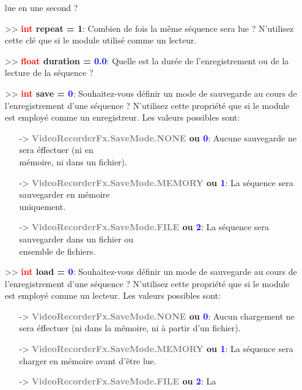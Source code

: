 \documentclass[a4paper, 11pt]{article}
\begin{document}
\begin{itemize}
		lue en une second ?\\
	 	\item[>> \textbf{\textcolor{red}{int} repeat = 1}:] Combien de fois la même séquence sera lue ?
	 	N'utilisez cette clé que si le module utilisé comme un lecteur.\\
		\item[>> \textbf{\textcolor{red}{float} duration = \textcolor{blue}{0.0}}:] Quelle est la durée
		de l'enregistrement ou de la lecture de la séquence ?\\
		\newpage \item[>> \textbf{\textcolor{red}{int} save = \textcolor{blue}{0}}:] Souhaitez-vous définir
		un mode de sauvegarde au cours de l'enregistrement d'une séquence ? N'utilisez cette propriété que
		si le module est employé comme un enregistreur. Les valeurs possibles sont:
		\begin{itemize}
			\item[-> \textbf{\textcolor{gray}{VideoRecorderFx.SaveMode.NONE} ou \textcolor{blue}{0}}:]
			Aucune sauvegarde ne sera éffectuer (ni en \\mémoire, ni dans un fichier).
			\item[-> \textbf{\textcolor{gray}{VideoRecorderFx.SaveMode.MEMORY} ou \textcolor{blue}{1}}:] La 
			séquence sera sauvegarder en mémoire \\uniquement.
			\item[-> \textbf{\textcolor{gray}{VideoRecorderFx.SaveMode.FILE} ou \textcolor{blue}{2}}:] La 
			séquence sera sauvegarder dans un fichier ou \\ensemble de fichiers.\\
		\end{itemize}
		\item[>> \textbf{\textcolor{red}{int} load = \textcolor{blue}{0}}:] Souhaitez-vous définir un mode
		de sauvegarde au cours de l'enregistrement d'une séquence ? N'utilisez cette propriété que si le
		module est employé comme un lecteur. Les valeurs possibles sont:
		\begin{itemize}
			\item[-> \textbf{\textcolor{gray}{VideoRecorderFx.SaveMode.NONE} ou \textcolor{blue}{0}}:]
			Aucun chargement ne sera éffectuer (ni dans la mémoire, ni à partir d'un fichier).
			\item[-> \textbf{\textcolor{gray}{VideoRecorderFx.SaveMode.MEMORY} ou \textcolor{blue}{1}}:] La 
			séquence sera charger en mémoire avant d'être lue.
			\item[-> \textbf{\textcolor{gray}{VideoRecorderFx.SaveMode.FILE} ou \textcolor{blue}{2}}:] La 

\end{itemize}
\end{itemize}
\end{document}
